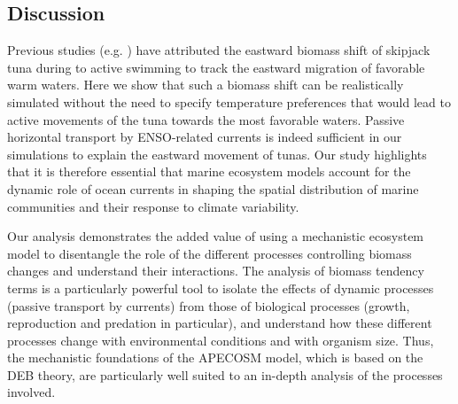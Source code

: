 \subsection{Discussion}

Previous studies (e.g. \citealp{lehodeyNinoSouthernOscillation1997, lehodeyPelagicEcosystemTropical2001}) have attributed the eastward biomass shift of skipjack tuna during \nino{} to active swimming to track the eastward migration of favorable warm waters. Here we show that such a biomass shift can be realistically simulated without the need to specify temperature preferences that would lead to active movements of the tuna towards the most favorable waters. Passive horizontal transport by ENSO-related currents is indeed sufficient in our simulations to explain the eastward movement of tunas. Our study highlights that it is therefore essential that marine ecosystem models account for the dynamic role of ocean currents in shaping the spatial distribution of marine communities and their response to climate variability.

Our analysis demonstrates the added value of using a mechanistic ecosystem model to disentangle the role of the different processes controlling biomass changes and understand their interactions. The analysis of biomass tendency terms is a particularly powerful tool to isolate the effects of dynamic processes (passive transport by currents) from those of biological processes (growth, reproduction and predation in particular), and understand how these different processes change with environmental conditions and with organism size. Thus, the mechanistic foundations of the APECOSM model, which is based on the DEB theory, are particularly well suited to an in-depth analysis of the processes involved.

